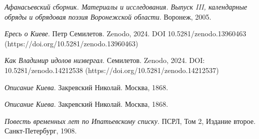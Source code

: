 \emph{Афанасьевский сборник. Материалы и исследования. Выпуск III, календарные обряды
и обрядовая поэзия Воронежской области}. Воронеж, 2005.

\emph{Ересь о Киеве}. Петр Семилетов. Zenodo, 2024. DOI 10.5281/zenodo.13960463 (https://doi.org/10.5281/zenodo.13960463)

\emph{Как Владимир идолов низвергал}. Семилетов. Zenodo, 2024. DOI: 10.5281/zenodo.14212538 (https://doi.org/10.5281/zenodo.14212537)

\emph{Описание Киева}. Закревский Николай. Москва, 1868.

\emph{Описание Киева}. Закревский Николай. Москва, 1868.

\emph{Повесть временных лет по Ипатьевскому списку}. ПСРЛ, Том 2, Издание второе. Санкт-Петербург, 1908. 

